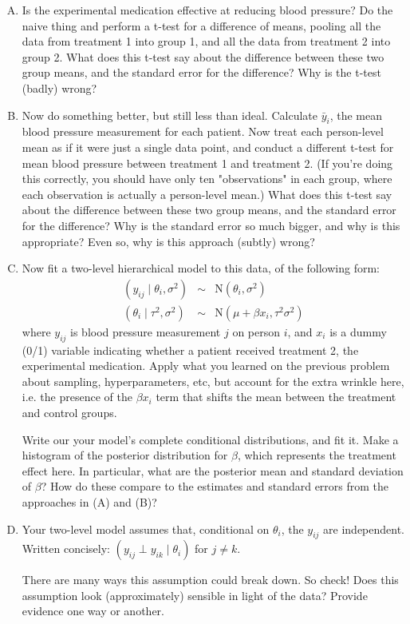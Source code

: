 \documentclass{mynotes}
\begin{document}
\begin{enumerate}[(A)]

\item Is the experimental medication effective at reducing blood pressure?  Do the naive thing and perform a t-test for a difference of means, pooling all the data from treatment 1 into group 1, and all the data from treatment 2 into group 2.  What does this t-test say about the difference between these two group means, and the standard error for the difference?  Why is the t-test (badly) wrong?

\item Now do something better, but still less than ideal.  Calculate $\bar{y}_i$, the mean blood pressure measurement for each patient.  Now treat each person-level mean as if it were just a single data point, and conduct a different t-test for mean blood pressure between treatment 1 and treatment 2.  (If you're doing this correctly, you should have only ten "observations" in each group, where each observation is actually a person-level mean.) What does this t-test say about the difference between these two group means, and the standard error for the difference?  Why is the standard error so much bigger, and why is this appropriate?  Even so, why is this approach (subtly) wrong?  

\item Now fit a two-level hierarchical model to this data, of the following form:
\begin{eqnarray*}
(y_{ij} \mid \theta_i, \sigma^2) &\sim& \mbox{N}(\theta_i, \sigma^2) \\
(\theta_i \mid \tau^2, \sigma^2) &\sim& \mbox{N}(\mu + \beta x_i, \tau^2 \sigma^2)
\end{eqnarray*}
where $y_{ij}$ is blood pressure measurement $j$ on person $i$, and $x_i$ is a dummy (0/1) variable indicating whether a patient received treatment 2, the experimental medication.   Apply what you learned on the previous problem about sampling, hyperparameters, etc, but account for the extra wrinkle here, i.e. the presence of the $\beta x_i$ term that shifts the mean between the treatment and control groups.  

Write our your model's complete conditional distributions, and fit it.  Make a histogram of the posterior distribution for $\beta$, which represents the treatment effect here.  In particular, what are the posterior mean and standard deviation of $\beta$?  How do these compare to the estimates and standard errors from the approaches in (A) and (B)?  

\item Your two-level model assumes that, conditional on $\theta_i$, the $y_{ij}$ are independent.  Written concisely: $(y_{ij} \perp y_{ik} \mid \theta_i)$ for $j \neq k$. 

There are many ways this assumption could break down.  So check!  Does this assumption look (approximately) sensible in light of the data?  Provide evidence one way or another.  

\end{enumerate}
\end{document}
